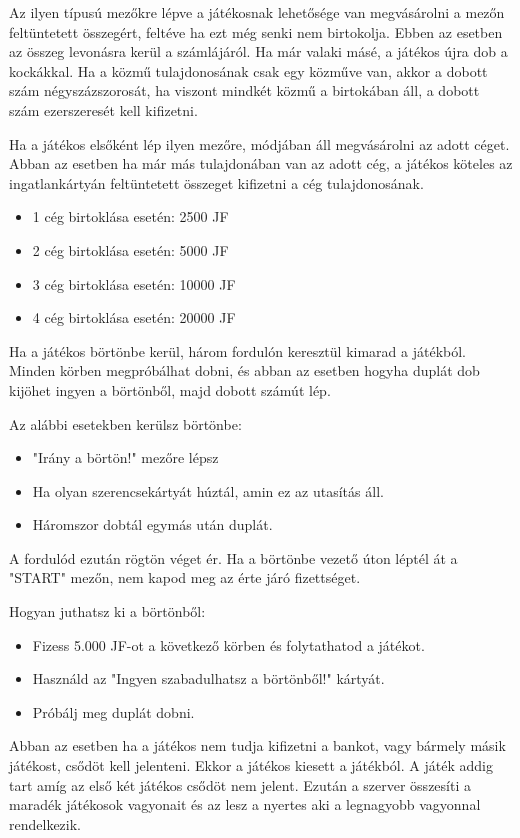 Az ilyen típusú mezőkre lépve a játékosnak lehetősége van megvásárolni a mezőn feltüntetett összegért, feltéve ha ezt még senki nem birtokolja. Ebben az esetben az összeg levonásra kerül a számlájáról. Ha már valaki másé, a játékos újra dob a kockákkal. Ha a közmű tulajdonosának csak egy közműve van, akkor a dobott szám négyszázszorosát, ha viszont mindkét közmű a birtokában áll, a dobott szám ezerszeresét kell kifizetni.


Ha a játékos elsőként lép ilyen mezőre, módjában áll megvásárolni az adott céget. Abban az esetben ha már más tulajdonában van az adott cég, a játékos köteles az ingatlankártyán feltüntetett összeget kifizetni a cég tulajdonosának.

\begin{itemize}
\item 1 cég birtoklása esetén: 2500 JF
\item 2 cég birtoklása esetén: 5000 JF
\item 3 cég birtoklása esetén: 10000 JF
\item 4 cég birtoklása esetén: 20000 JF
\end{itemize}


Ha a játékos börtönbe kerül, három fordulón keresztül kimarad a játékból. Minden körben megpróbálhat dobni, és abban az esetben hogyha duplát dob kijöhet ingyen a börtönből, majd dobott számút lép.

Az alábbi esetekben kerülsz börtönbe:

\begin{itemize}
\item "Irány a börtön!" mezőre lépsz
\item Ha olyan szerencsekártyát húztál, amin ez az utasítás áll.
\item Háromszor dobtál egymás után duplát.
\end{itemize}

A fordulód ezután rögtön véget ér. Ha a börtönbe vezető úton léptél át a "START" mezőn, nem kapod meg az érte járó fizettséget.

Hogyan juthatsz ki a börtönből:

\begin{itemize}
\item Fizess 5.000 JF-ot a következő körben és folytathatod a játékot.
\item Használd az "Ingyen szabadulhatsz a börtönből!" kártyát.
\item Próbálj meg duplát dobni.
\end{itemize}


Abban az esetben ha a játékos nem tudja kifizetni a bankot, vagy bármely másik játékost, csődöt kell jelenteni. Ekkor a játékos kiesett a játékból. A játék addig tart amíg az első két játékos csődöt nem jelent. Ezután a szerver összesíti a maradék játékosok vagyonait és az lesz a nyertes aki a legnagyobb vagyonnal rendelkezik. 





